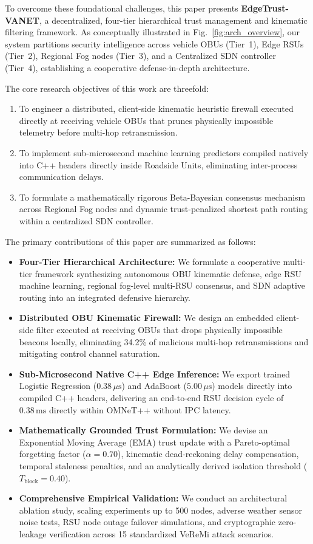 \documentclass[conference]{IEEEtran}
\begin{document}
To overcome these foundational challenges, this paper presents \textbf{EdgeTrust-VANET}, a decentralized, four-tier hierarchical trust management and kinematic filtering framework. As conceptually illustrated in Fig.~\ref{fig:arch_overview}, our system partitions security intelligence across vehicle OBUs (Tier~1), Edge RSUs (Tier~2), Regional Fog nodes (Tier~3), and a Centralized SDN controller (Tier~4), establishing a cooperative defense-in-depth architecture.

The core research objectives of this work are threefold:
\begin{enumerate}
    \item To engineer a distributed, client-side kinematic heuristic firewall executed directly at receiving vehicle OBUs that prunes physically impossible telemetry before multi-hop retransmission.
    \item To implement sub-microsecond machine learning predictors compiled natively into C++ headers directly inside Roadside Units, eliminating inter-process communication delays.
    \item To formulate a mathematically rigorous Beta-Bayesian consensus mechanism across Regional Fog nodes and dynamic trust-penalized shortest path routing within a centralized SDN controller.
\end{enumerate}

The primary contributions of this paper are summarized as follows:
\begin{itemize}
    \item \textbf{Four-Tier Hierarchical Architecture:} We formulate a cooperative multi-tier framework synthesizing autonomous OBU kinematic defense, edge RSU machine learning, regional fog-level multi-RSU consensus, and SDN adaptive routing into an integrated defensive hierarchy.
    \item \textbf{Distributed OBU Kinematic Firewall:} We design an embedded client-side filter executed at receiving OBUs that drops physically impossible beacons locally, eliminating 34.2\% of malicious multi-hop retransmissions and mitigating control channel saturation.
    \item \textbf{Sub-Microsecond Native C++ Edge Inference:} We export trained Logistic Regression ($0.38\,\mu\text{s}$) and AdaBoost ($5.00\,\mu\text{s}$) models directly into compiled C++ headers, delivering an end-to-end RSU decision cycle of $0.38\,\text{ms}$ directly within OMNeT++ without IPC latency.
    \item \textbf{Mathematically Grounded Trust Formulation:} We devise an Exponential Moving Average (EMA) trust update with a Pareto-optimal forgetting factor ($\alpha=0.70$), kinematic dead-reckoning delay compensation, temporal staleness penalties, and an analytically derived isolation threshold ($T_{\text{block}} = 0.40$).
    \item \textbf{Comprehensive Empirical Validation:} We conduct an architectural ablation study, scaling experiments up to 500 nodes, adverse weather sensor noise tests, RSU node outage failover simulations, and cryptographic zero-leakage verification across 15 standardized VeReMi attack scenarios.
\end{itemize}
\end{document}
